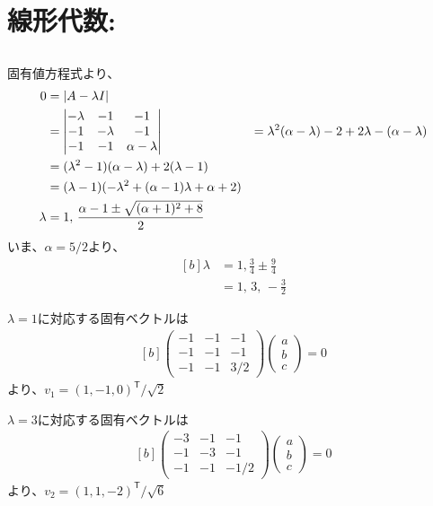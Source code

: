 \documentclass[../ap_2012.tex]{subfiles}
\begin{document}
\setcounter{chapter}{1}
\chapter{線形代数:}
\section{}
固有値方程式より、
\begin{equation}\begin{aligned}[b]
    0 &= \abs{A-\lambda I}\\
    &= \begin{vmatrix}
        -\lambda & -1 & -1\\
        -1 & -\lambda & -1\\
        -1 & -1 & \alpha-\lambda
    \end{vmatrix}
    &=\lambda^2(\alpha-\lambda)-2+2\lambda-(\alpha-\lambda)\\
    &=(\lambda^2-1)(\alpha-\lambda)+2(\lambda-1)\\
    &=(\lambda-1)(-\lambda^2+(\alpha-1)\lambda+\alpha+2)\\
    \lambda &= 1,\,\frac{\alpha-1\pm\sqrt{(\alpha+1)^2+8}}{2}
\end{aligned}\end{equation}
いま、\(\alpha=5/2\)より、
\begin{equation}\begin{aligned}[b]
    \lambda &= 1, \frac{3}{4}\pm\frac{9}{4}\\
    &=1,\,3,\,-\frac{3}{2}
\end{aligned}\end{equation}

\(\lambda=1\)に対応する固有ベクトルは
\begin{equation}\begin{aligned}[b]
    \begin{pmatrix}
        -1 & -1 & -1\\
        -1 & -1 & -1\\
        -1 & -1 & 3/2
    \end{pmatrix}\begin{pmatrix}
        a\\b\\c
    \end{pmatrix}
    =0
\end{aligned}\end{equation}
より、\(v_1=(1,-1,0)^\mathsf{T}/\sqrt{2}\)

\(\lambda=3\)に対応する固有ベクトルは
\begin{equation}\begin{aligned}[b]
    \begin{pmatrix}
        -3 & -1 & -1\\
        -1 & -3 & -1\\
        -1 & -1 & -1/2
    \end{pmatrix}\begin{pmatrix}
        a\\b\\c
    \end{pmatrix}
    =0
\end{aligned}\end{equation}
より、\(v_2=(1,1,-2)^\mathsf{T}/\sqrt{6}\)
\end{document}
